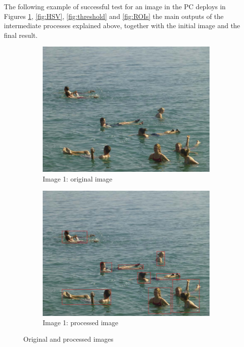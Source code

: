 
The following example of successful test for an image in the PC deploys in Figures \ref{fig:original_final},
\ref{fig:HSV}, \ref{fig:threshold} and \ref{fig:ROIs} the main outputs of the intermediate processes explained above,
together with the initial image and the final result. 

\begin{figure}[H]
        \centering
        \begin{subfigure}[h]{0.3\textwidth}
                \includegraphics[width=\textwidth]{Images/ocean7}
                \caption{Image 1: original image}
        \end{subfigure}%
        \quad
        \begin{subfigure}[h]{0.3\textwidth}
                \includegraphics[width=\textwidth]{Images/final}
                \caption{Image 1: processed image}
        \end{subfigure}
        \caption{Original and processed images}
        \label{fig:original_final}
\end{figure}

